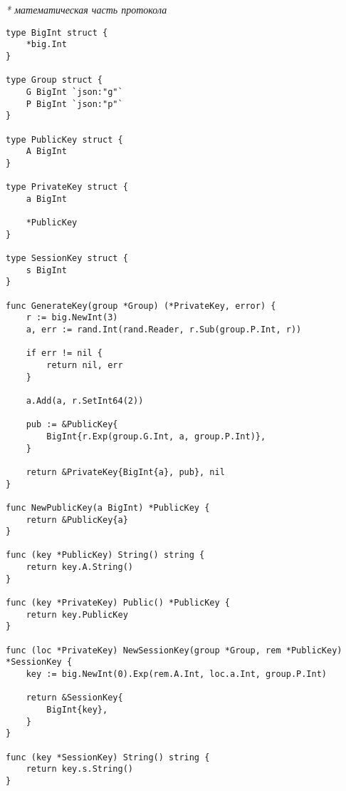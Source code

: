 \documentclass[12pt, a4paper]{article}
\begin{document}
\textit{* математическая часть протокола}
\begin{verbatim}
type BigInt struct {
	*big.Int
}

type Group struct {
	G BigInt `json:"g"`
	P BigInt `json:"p"`
}

type PublicKey struct {
	A BigInt
}

type PrivateKey struct {
	a BigInt

	*PublicKey
}

type SessionKey struct {
	s BigInt
}

func GenerateKey(group *Group) (*PrivateKey, error) {
	r := big.NewInt(3)
	a, err := rand.Int(rand.Reader, r.Sub(group.P.Int, r))

	if err != nil {
		return nil, err
	}

	a.Add(a, r.SetInt64(2))

	pub := &PublicKey{
		BigInt{r.Exp(group.G.Int, a, group.P.Int)},
	}

	return &PrivateKey{BigInt{a}, pub}, nil
}

func NewPublicKey(a BigInt) *PublicKey {
	return &PublicKey{a}
}

func (key *PublicKey) String() string {
	return key.A.String()
}

func (key *PrivateKey) Public() *PublicKey {
	return key.PublicKey
}

func (loc *PrivateKey) NewSessionKey(group *Group, rem *PublicKey) *SessionKey {
	key := big.NewInt(0).Exp(rem.A.Int, loc.a.Int, group.P.Int)

	return &SessionKey{
		BigInt{key},
	}
}

func (key *SessionKey) String() string {
	return key.s.String()
}
\end{verbatim}
\end{document}

